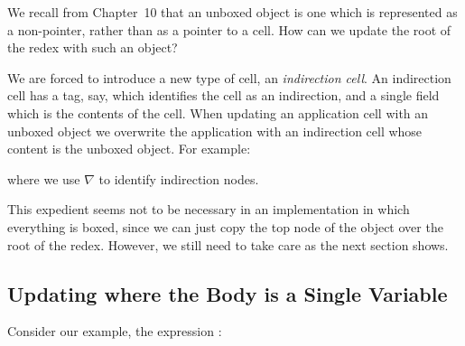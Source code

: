We recall from Chapter~10 that an unboxed object is one which is represented
as a non-pointer, rather than as a pointer to a cell. How can we update the root
of the redex with such an object?

We are forced to introduce a new type of cell, an \textit{indirection cell}. An
indirection cell has a tag,  say, which identifies the cell as an indirection,
and a single field which is the contents of the cell. When updating an
application cell with an unboxed object we overwrite the application with an
indirection cell whose content is the unboxed object. For example:


\noindent where we use $\nabla$ to identify indirection nodes.

This expedient seems not to be necessary in an implementation in which
everything is boxed, since we can just copy the top node of the object over the
root of the redex. However, we still need to take care as the next section
shows.

\subsection{Updating where the Body is a Single Variable}

Consider our example, the expression :


